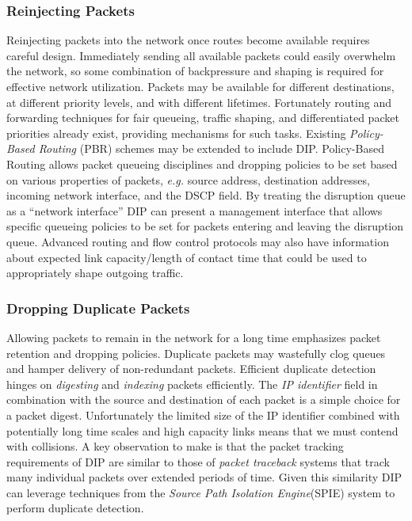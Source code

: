 \documentclass[10pt,letterpaper]{article}
\begin{document}
\subsubsection{Reinjecting Packets}
Reinjecting packets into the network once routes become available
requires careful design. Immediately sending all available packets
could easily overwhelm the network, so some combination of
backpressure and shaping is required for effective network utilization.
Packets may be available for different destinations,
at different priority levels, and with different lifetimes. Fortunately
routing and forwarding techniques for fair queueing, traffic
shaping, and differentiated packet priorities already exist, providing
mechanisms for such tasks. Existing {\em Policy-Based Routing} (PBR)
schemes may be extended to include DIP. Policy-Based Routing allows
packet queueing disciplines and dropping policies to be set based
on various properties of packets, {\em e.g.} source address, destination
addresses, incoming network interface, and the DSCP field. By treating
the disruption queue as a ``network interface'' DIP can present
a management interface that allows specific queueing policies to 
be set for packets entering and leaving the disruption queue.
Advanced routing and flow control protocols may also have
information about expected link capacity/length of contact time that
could be used to appropriately shape outgoing traffic.

\subsubsection{Dropping Duplicate Packets}
Allowing packets to remain in the network for a long time emphasizes
packet retention and dropping policies. Duplicate packets may
wastefully clog queues and hamper delivery of non-redundant packets.
Efficient duplicate detection hinges on {\em digesting} and
{\em indexing} packets efficiently. The {\em IP identifier}
field in combination with the source and destination of each
packet is a simple choice for a packet digest. Unfortunately
the limited size of the IP identifier combined with potentially
long time scales and high capacity links means that we must
contend with collisions. A key observation to make is that
the packet tracking requirements of DIP are similar to those
of {\em packet traceback} systems that track many individual
packets over extended periods of time. Given this similarity
DIP can leverage techniques from the
{\em Source Path Isolation Engine}(SPIE)\cite{spie} system to perform
duplicate detection.
\end{document}
